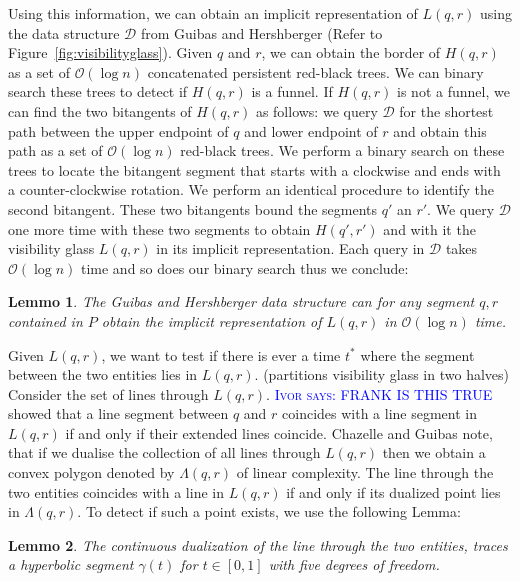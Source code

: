 \documentclass[a4paper, UKenglish]{paper}
\newcommand{\myremark}[4]{\textcolor{blue}{\textsc{#1 #2:}} \textcolor{#4}{\textsf{#3}}}
\newcommand{\ivor}[2][says]{\myremark{Ivor}{#1}{#2}{Blue}}
\newtheorem{lemma}{Lemmo}
\begin{document}
Using this information, we can obtain an implicit representation of $L(q,r)$ using the data structure $\mathcal{D}$ from Guibas and Hershberger (Refer to Figure~\ref{fig:visibilityglass}). Given $q$ and $r$, we can obtain the border of $H(q,r)$ as a set of $\mathcal{O}(\log n)$ concatenated persistent red-black trees. We can binary search these trees to detect if $H(q,r)$ is a funnel. If $H(q,r)$ is not a funnel, we can find the two bitangents of $H(q,r)$ as follows: we query $\mathcal{D}$ for the shortest path between the upper endpoint of $q$ and lower endpoint of $r$ and obtain this path as a set of $\mathcal{O}(\log n)$ red-black trees. We perform a binary search on these trees to locate the bitangent segment that starts with a clockwise and ends with a counter-clockwise rotation. We perform an identical procedure to identify the second bitangent.
These two bitangents bound the segments $q'$ an $r'$. We query $\mathcal{D}$ one more time with these two segments to obtain $H(q', r')$ and with it the visibility glass $L(q,r)$ in its implicit representation. Each query in $\mathcal{D}$ takes $\mathcal{O}(\log n)$ time and so does our binary search thus we conclude:

\begin{lemma}
\label{lemma:visibilityquery}
  The Guibas and Hershberger data structure can for any segment $q,r$ contained in $P$ obtain the implicit representation of $L(q,r)$ in $\mathcal{O}(\log n)$ time.
\end{lemma}

 
Given $L(q,r)$, we want to test if there is ever a time $t^*$ where the segment between the two entities lies in $L(q,r)$. (partitions visibility glass in two halves) Consider the set of lines through $L(q,r)$. \ivor{FRANK IS THIS TRUE} showed that a line segment between $q$ and $r$ coincides with a line segment in $L(q,r)$ if and only if their extended lines coincide. Chazelle and Guibas \cite{Chazelle1989} note, that if we dualise the collection of all lines through $L(q,r)$ then we obtain a convex polygon denoted by $\Lambda(q,r)$ of linear complexity. The line through the two entities coincides with a line in $L(q,r)$ if and only if its dualized point lies in $\Lambda(q,r)$. To detect if such a point exists, we use the following Lemma:

\begin{lemma}
\label{lemma:hyperbola}
  The continuous dualization of the line through the two entities, traces a hyperbolic segment $\gamma(t)$ for $t \in [0,1]$ with five degrees of freedom.
\end{lemma}
\end{document}
